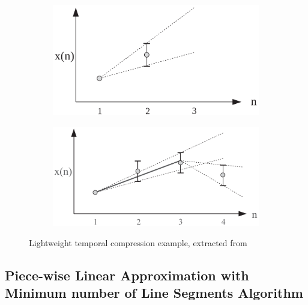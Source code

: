 \begin{figure}
    \centering
    \begin{subfigure}{\columnwidth}
        \centering
        \includegraphics[width=.8\columnwidth]{figures/LTC-a.png}
        \caption{}
        \label{fig:ltc-review-a}
    \end{subfigure}
    \centering
    \begin{subfigure}{\columnwidth}
        \centering
        \includegraphics[width=.8\columnwidth]{figures/LTC-b.png}
        \caption{}
        \label{fig:ltc-review-b}
    \end{subfigure}
    \caption{Lightweight temporal compression example, extracted from~\cite{zordan2014performance}}
    \label{fig:ltc-review}
\end{figure}



\subsection{Piece-wise Linear Approximation
with Minimum number of Line Segments Algorithm}


